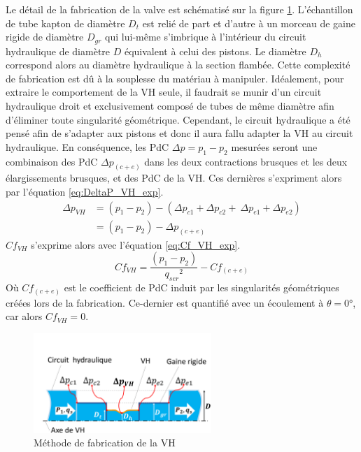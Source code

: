 Le détail de la fabrication de la valve est schématisé sur la figure \ref{fig:fabrication_tube_experimental}. L'échantillon de tube kapton de diamètre $D_t$ est relié de part et d'autre à un morceau de gaine rigide de diamètre $D_{gr}$ qui lui-même s'imbrique à l'intérieur du circuit hydraulique de diamètre $D$ équivalent à celui des pistons. Le diamètre $D_h$ correspond alors au diamètre hydraulique à la section flambée. Cette complexité de fabrication est dû à la souplesse du matériau à manipuler. Idéalement, pour extraire le comportement de la VH seule, il faudrait se munir d'un circuit hydraulique droit et exclusivement composé de tubes de même diamètre afin d'éliminer toute singularité géométrique. Cependant, le circuit hydraulique a été pensé afin de s'adapter aux pistons et donc il aura fallu adapter la VH au circuit hydraulique. En conséquence, les PdC $\Delta p = p_1 - p_2$ mesurées seront une combinaison des PdC $\Delta p_{(c+e)}$ dans les deux contractions brusques et les deux élargissements brusques, et des PdC de la VH.  Ces dernières s'expriment alors par l'équation \ref{eq:DeltaP_VH_exp}. 
\begin{equation}
	\begin{split} 
\Delta p_{VH} & = (p_1 - p_2) - (\Delta p_{c1}+\Delta p_{c2}+\ \Delta p_{e1}+\Delta p_{e2})	\\
			  & = (p_1 - p_2) - \Delta p_{(c+e)}
	\end{split}
	\label{eq:DeltaP_VH_exp}
\end{equation}
$Cf_{VH}$ s'exprime alors avec l'équation \ref{eq:Cf_VH_exp}.
\begin{equation}
	Cf_{VH} = \dfrac{(p_1 - p_2)}{{q_{ser}}^2} - Cf_{(c+e)}
\label{eq:Cf_VH_exp}
\end{equation}
Où $Cf_{(c+e)}$ est le coefficient de PdC induit par les singularités géométriques créées lors de la fabrication. Ce-dernier est quantifié avec un écoulement à $\theta = \ang{0}$, car alors $Cf_{VH}=0$. 
\begin{figure}[!htb]
\begin{center}
    \captionsetup{justification=centering} 
	\includegraphics[trim={2cm 0cm 0cm 4cm},clip,width=0.6\textwidth]{../Chap4/Figure/fabrication_tube_experimental.pdf}
	\caption{Méthode de fabrication de la VH}
	\label{fig:fabrication_tube_experimental}
\end{center}	
\end{figure}    
